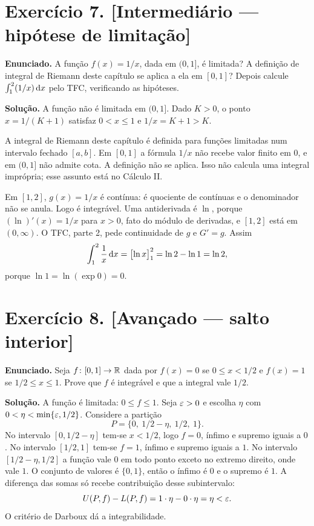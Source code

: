 \documentclass[11pt,a4paper]{article}
\begin{document}
\section*{Exercício 7. [Intermediário --- hipótese de limitação]}

\textbf{Enunciado.} A função $f(x)=1/x$, dada em $(0,1]$, é limitada? A definição de integral de Riemann deste capítulo se aplica a ela em $[0,1]$? Depois calcule $\int_1^2(1/x)\,\mathrm{d} x$ pelo TFC, verificando as hipóteses.

\textbf{Solução.}
A função não é limitada em $(0,1]$. Dado $K>0$, o ponto $x=1/(K+1)$ satisfaz $0<x\le 1$ e $1/x=K+1>K$.

A integral de Riemann deste capítulo é definida para funções limitadas num intervalo fechado $[a,b]$. Em $[0,1]$ a fórmula $1/x$ não recebe valor finito em $0$, e em $(0,1]$ não admite cota. A definição não se aplica. Isso não calcula uma integral imprópria; esse assunto está no Cálculo II.

Em $[1,2]$, $g(x)=1/x$ é contínua: é quociente de contínuas e o denominador não se anula. Logo é integrável. Uma antiderivada é $\ln$, porque $(\ln)'(x)=1/x$ para $x>0$, fato do módulo de derivadas, e $[1,2]$ está em $(0,\infty)$. O TFC, parte 2, pede continuidade de $g$ e $G' = g$. Assim
\[
\int_1^2\frac{1}{x}\,\mathrm{d} x
=\bigl[\ln x\bigr]_1^2
=\ln 2-\ln 1
=\ln 2,
\]
porque $\ln 1=\ln(\exp 0)=0$.

\section*{Exercício 8. [Avançado --- salto interior]}

\textbf{Enunciado.} Seja $f\colon[0,1]\to\mathbb{R}$ dada por $f(x)=0$ se $0\le x<1/2$ e $f(x)=1$ se $1/2\le x\le 1$. Prove que $f$ é integrável e que a integral vale $1/2$.

\textbf{Solução.}
A função é limitada: $0\le f\le 1$. Seja $\varepsilon>0$ e escolha $\eta$ com $0<\eta<\min\{\varepsilon,1/2\}$. Considere a partição
\[
P=\{0,\ 1/2-\eta,\ 1/2,\ 1\}.
\]
No intervalo $[0,1/2-\eta]$ tem-se $x<1/2$, logo $f=0$, ínfimo e supremo iguais a $0$. No intervalo $[1/2,1]$ tem-se $f=1$, ínfimo e supremo iguais a $1$. No intervalo $[1/2-\eta,1/2]$ a função vale $0$ em todo ponto exceto no extremo direito, onde vale $1$. O conjunto de valores é $\{0,1\}$, então o ínfimo é $0$ e o supremo é $1$. A diferença das somas só recebe contribuição desse subintervalo:
\[
U(P,f)-L(P,f)=1\cdot\eta-0\cdot\eta=\eta<\varepsilon.
\]
O critério de Darboux dá a integrabilidade.
\end{document}
